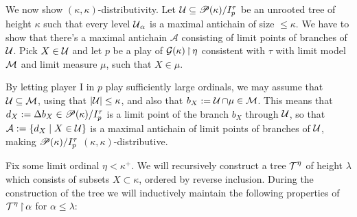 \documentclass[../../main]{subfiles}
\begin{document}
{{		\qquad We now show $(\kappa,\kappa)$-distributivity. Let $\operatorname{\mathcal U}\subseteq\mathscr P(\kappa)/I_p^\tau$ be an unrooted tree of height $\kappa$ such that every level $\operatorname{\mathcal U}_\alpha$ is a maximal antichain of size $\leq\kappa$. We have to show that there's a maximal antichain $\mathcal A$ consisting of limit points of branches of $\operatorname{\mathcal U}$. Pick $X\in\operatorname{\mathcal U}$ and let $p$ be a play of $\operatorname{\mathcal G}(\kappa)\operatorname{\upharpoonright}\eta$ consistent with $\tau$ with limit model $\operatorname{\mathcal M}$ and limit measure $\mu$, such that $X\in\mu$.
		
		\qquad By letting player I in $p$ play sufficiently large ordinals, we may assume that $\operatorname{\mathcal U}\subseteq\operatorname{\mathcal M}$, using that $\left|\operatorname{\mathcal U}\right|\leq\kappa$, and also that $b_X:=\operatorname{\mathcal U}\cap\mu\in\operatorname{\mathcal M}$. This means that $d_X:=\Delta b_X\in\mathscr P(\kappa)/I_p^\tau$ is a limit point of the branch $b_X$ through $\operatorname{\mathcal U}$, so that $\mathcal A:=\{d_X\mid X\in\operatorname{\mathcal U}\}$ is a maximal antichain of limit points of branches of $\operatorname{\mathcal U}$, making $\mathscr P(\kappa)/I_p^\tau$ $(\kappa,\kappa)$-distributive.
	}

	Fix some limit ordinal $\eta<\kappa^+$. We will recursively construct a tree $\operatorname{\mathcal T}^\eta$ of height $\lambda$ which consists of subsets $X\subset\kappa$, ordered by reverse inclusion. During the construction of the tree we will inductively maintain the following properties of $\operatorname{\mathcal T}^\eta\operatorname{\upharpoonright}\alpha$ for $\alpha\leq\lambda$:\\

}
\end{document}
